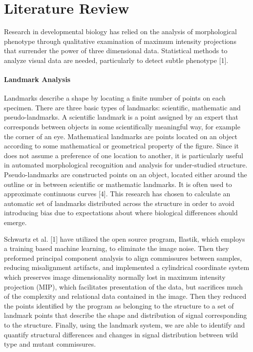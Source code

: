 \documentclass[10pt,letterpaper]{article}
\begin{document}
\section{Literature Review}\label{literature-review}

Research in developmental biology has relied on the analysis of
morphological phenotype through qualitative examination of maximum
intensity projections that surrender the power of three dimensional
data. Statistical methods to analyze visual data are needed,
particularly to detect subtle phenotype {[}1{]}.

\paragraph{Landmark Analysis}\label{landmark-analysis}

Landmarks describe a shape by locating a finite number of points on each
specimen. There are three basic types of landmarks: scientific,
mathematic and pseudo-landmarks. A scientific landmark is a point
assigned by an expert that corresponds between objects in some
scientifically meaningful way, for example the corner of an eye.
Mathematical landmarks are points located on an object according to some
mathematical or geometrical property of the figure. Since it does not
assume a preference of one location to another, it is particularly
useful in automated morphological recognition and analysis for
under-studied structure. Pseudo-landmarks are constructed points on an
object, located either around the outline or in between scientific or
mathematic landmarks. It is often used to approximate continuous curves
{[}4{]}. This research has chosen to calculate an automatic set of
landmarks distributed across the structure in order to avoid introducing
bias due to expectations about where biological differences should
emerge.

Schwartz et al. {[}1{]} have utilized the open source program, Ilastik,
which employs a training based machine learning, to eliminate the image
noise. Then they preformed principal component analysis to align
commissures between samples, reducing misalignment artifacts, and
implemented a cylindrical coordinate system which preserves image
dimensionality normally lost in maximum intensity projection (MIP),
which facilitates presentation of the data, but sacrifices much of the
complexity and relational data contained in the image. Then they reduced
the points identified by the program as belonging to the structure to a
set of landmark points that describe the shape and distribution of
signal corresponding to the structure. Finally, using the landmark
system, we are able to identify and quantify structural differences and
changes in signal distribution between wild type and mutant commissures.
\end{document}
